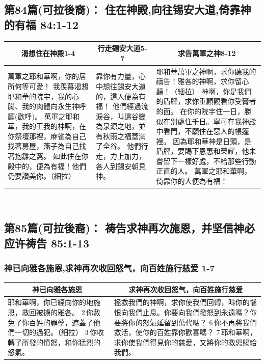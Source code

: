 \subsection{第84篇(可拉後裔)： 住在神殿,向往锡安大道,倚靠神的有福  84:1-12}
\begin{table}[H]
\centering
\begin{tabular}{p{5.9cm}|p{3.6cm}|p{7.900cm}}\hline\hline
\multicolumn{1}{c|}{渴想住在神殿1-4}&\multicolumn{1}{c|}{行走錫安大道5-7}&\multicolumn{1}{c}{求告萬軍之神8-12}\\\hline
萬軍之耶和華啊，你的居所何等可愛！
我羨慕渴想耶和華的院宇，我的心腸、我的肉體向永生神呼籲(歡呼)。
萬軍之耶和華，我的王我的神啊，在你祭壇那裡，麻雀為自己找著房屋，燕子為自己找著抱雛之窩。
如此住在你殿中的，便為有福！他們仍要讚美你。（細拉）
&靠你有力量，心中想往錫安大道的，這人便為有福！
他們經過流淚谷，叫這谷變為泉源之地，並有秋雨之福蓋滿了全谷。
他們行走，力上加力，各人到錫安朝見神。
&耶和華萬軍之神啊，求你聽我的禱告！雅各的神啊，求你留心聽！（細拉）
神啊，你是我們的盾牌，求你垂顧觀看你受膏者的面。
在你的院宇住一日，勝似在別處住千日。寧可在我神殿中看門，不願住在惡人的帳篷裡。
因為耶和華神是日頭，是盾牌，要賜下恩惠和榮耀，他未嘗留下一樣好處，不給那些行動正直的人。
萬軍之耶和華啊，倚靠你的人便為有福！\\\hline
\end{tabular}
\end{table} 


\subsection{第85篇(可拉後裔)： 祷告求神再次施恩，并坚信神必应许祷告 85:1-13}
\subsubsection{神已向雅各施恩,求神再次收回怒气，向百姓施行慈爱 1-7}
\begin{table}[H]
\centering
\begin{tabular}{p{6.75cm}|p{10.00cm}}\hline\hline
\multicolumn{1}{c|}{神已向雅各施恩}&\multicolumn{1}{c}{求神再次收回怒气，向百姓施行慈爱}\\\hline
耶和華啊，你已經向你的地施恩，救回被擄的雅各。
2 你赦免了你百姓的罪孽，遮蓋了他們一切的過犯。（細拉）
3 你收轉了所發的憤怒，和你猛烈的怒氣。
&拯救我們的神啊，求你使我們回轉，叫你的惱恨向我們止息。你要向我們發怒到永遠嗎？你要將你的怒氣延留到萬代嗎？
6 你不再將我們救活，使你的百姓靠你歡喜嗎？
7 耶和華啊，求你使我們得見你的慈愛，又將你的救恩賜給我們。\\\hline
\end{tabular}
\end{table} 

